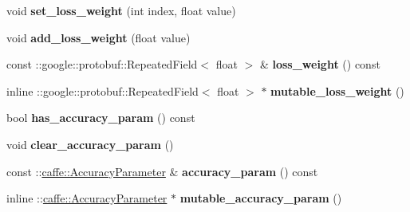 \begin{DoxyCompactItemize}
\mbox{\label{classcaffe_1_1_v1_layer_parameter_a76391e060875038577a26ffc43134c83}} 
void {\bfseries set\+\_\+loss\+\_\+weight} (int index, float value)
\item 
\mbox{\label{classcaffe_1_1_v1_layer_parameter_a435da107ef90340ba62e732e6034b837}} 
void {\bfseries add\+\_\+loss\+\_\+weight} (float value)
\item 
\mbox{\label{classcaffe_1_1_v1_layer_parameter_aff1f31d7c683e41d345b0c4571b26eaf}} 
const \+::google\+::protobuf\+::\+Repeated\+Field$<$ float $>$ \& {\bfseries loss\+\_\+weight} () const
\item 
\mbox{\label{classcaffe_1_1_v1_layer_parameter_a29d252baee51f2e66556b4eff08097d9}} 
inline \+::google\+::protobuf\+::\+Repeated\+Field$<$ float $>$ $\ast$ {\bfseries mutable\+\_\+loss\+\_\+weight} ()
\item 
\mbox{\label{classcaffe_1_1_v1_layer_parameter_ac06dce8f9aec2f3f9eb2b625f4429cfa}} 
bool {\bfseries has\+\_\+accuracy\+\_\+param} () const
\item 
\mbox{\label{classcaffe_1_1_v1_layer_parameter_a2f3e2107f4686a3e640585930e331360}} 
void {\bfseries clear\+\_\+accuracy\+\_\+param} ()
\item 
\mbox{\label{classcaffe_1_1_v1_layer_parameter_ab9910d7edf6846733dd1a47cfe55556e}} 
const \+::\mbox{\hyperlink{classcaffe_1_1_accuracy_parameter}{caffe\+::\+Accuracy\+Parameter}} \& {\bfseries accuracy\+\_\+param} () const
\item 
\mbox{\label{classcaffe_1_1_v1_layer_parameter_a52f25226db4767862e66b1abc2922f22}} 
inline \+::\mbox{\hyperlink{classcaffe_1_1_accuracy_parameter}{caffe\+::\+Accuracy\+Parameter}} $\ast$ {\bfseries mutable\+\_\+accuracy\+\_\+param} ()
\item 
\mbox{\label{classcaffe_1_1_v1_layer_parameter_a9ee5d40aac38e80ec31a5d3d5633fbac}} 

\end{DoxyCompactItemize}
